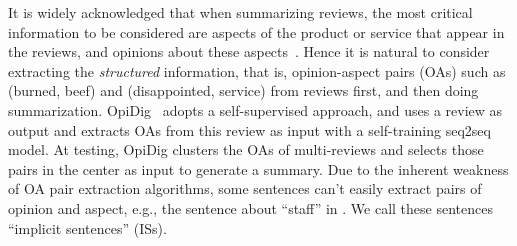 

It is widely acknowledged that when summarizing reviews, the most critical information
to be considered are 
aspects of the product or service that appear in the reviews,
and opinions about these aspects~\cite{AngelidisL18,MukherjeePVGBG20}.
Hence it is natural to consider extracting the {\em structured} information, 
that is, opinion-aspect pairs (OAs) such as (burned, beef) and (disappointed, service) 
from reviews first, and then doing summarization.
OpiDig~\cite{OpiDig20} adopts a self-supervised approach, and uses a review as output 
and extracts OAs from this review as input with a self-training seq2seq model.
At testing, OpiDig clusters the OAs 
of multi-reviews and selects those pairs in the center as input to 
generate a summary. 
Due to the inherent weakness of OA pair extraction algorithms, %
some sentences can't easily extract pairs of opinion and aspect,
e.g., the sentence about ``staff'' in . 
We call these sentences ``implicit sentences'' (ISs).

